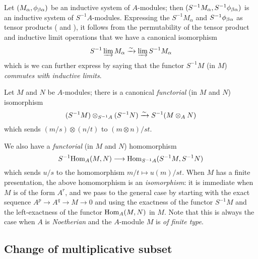 \begin{env}[1.3.3]
\label{0.1.3.3}
Let $(M_\alpha,\phi_{\beta\alpha})$ be an inductive system of $A$-modules; then
$(S^{-1}M_\alpha,S^{-1}\phi_{\beta\alpha})$ is an inductive system of
$S^{-1}A$-modules. Expressing the $S^{-1}M_\alpha$ and
$S^{-1}\phi_{\beta\alpha}$ as tensor products ( and
), it follows from the permutability of the tensor product and
inductive limit operations that we have a canonical isomorphism
\[
  S^{-1}\varinjlim M_\alpha\xrightarrow{\sim}\varinjlim S^{-1}M_\alpha
\]
which is we can further express by saying that the functor $S^{-1}M$ (in $M$)
{\em commutes with inductive limits}.
\end{env}

\begin{env}[1.3.4]
\label{0.1.3.4}
Let $M$ and $N$ be $A$-modules; there is a canonical {\em functorial} (in $M$ and $N$) isomorphism
\[
  (S^{-1}M)\otimes_{S^{-1}A}(S^{-1}N)\xrightarrow{\sim} S^{-1}(M\otimes_A N)
\]
which sends $(m/s)\otimes(n/t)$ to $(m\otimes n)/st$.
\end{env}

\begin{env}[1.3.5]
\label{0.1.3.5}
We also have a {\em functorial} (in $M$ and $N$) homomorphism
\[
  S^{-1}{\mathop{\mathrm{Hom}}\nolimits}_A(M,N)\longrightarrow{\mathop{\mathrm{Hom}}\nolimits}_{S^{-1}A}(S^{-1}M,S^{-1}N)
\]
which sends $u/s$ to the homomorphism $m/t\mapsto u(m)/st$. When $M$ has a
finite presentation, the above homomorphism is an {\em isomorphism}: it is
immediate when $M$ is of the form $A^r$, and we pass to the general case by
starting with the exact sequence $A^p\to A^q\to M\to 0$ and using the
exactness of the functor $S^{-1}M$ and the left-exactness of the functor
${\mathop{\mathrm{Hom}}\nolimits}_A(M,N)$ in $M$. Note that this is always the case when $A$ is
{\em Noetherian} and the $A$-module $M$ is {\em of finite type}.
\end{env}

\subsection{Change of multiplicative subset}
\label{subsection-change-of-mult-subset}


